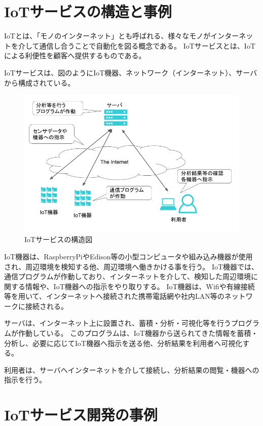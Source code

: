 \section{IoTサービスの構造と事例}
IoTとは、「モノのインターネット」とも呼ばれる、様々なモノがインターネットを介して通信し合うことで自動化を図る概念である。
IoTサービスとは、IoTによる利便性を顧客へ提供するものである。

IoTサービスは、図のようにIoT機器、ネットワーク（インターネット）、サーバから構成されている。
\begin{figure}[htbp]
\includegraphics[width=16cm]{images/IoTstract.png}
\caption{IoTサービスの構造図}
\label{fig:iotstract}
\end{figure}

IoT機器は、RaspberryPiやEdison等の小型コンピュータや組み込み機器が使用され、周辺環境を検知する他、周辺環境へ働きかける事を行う。
IoT機器では、通信プログラムが作動しており、インターネットを介して、検知した周辺環境に関する情報や、IoT機器への指示をやり取りする。
IoT機器は、Wifiや有線接続等を用いて、インターネットへ接続された携帯電話網や社内LAN等のネットワークに接続される。

サーバは、インターネット上に設置され、蓄積・分析・可視化等を行うプログラムが作動している。
このプログラムは、IoT機器から送られてきた情報を蓄積・分析し、必要に応じてIoT機器へ指示を送る他、分析結果を利用者へ可視化する。

利用者は、サーバへインターネットを介して接続し、分析結果の閲覧・機器への指示を行う。

\section{IoTサービス開発の事例}

